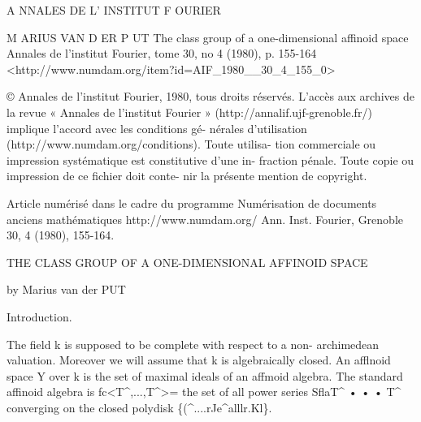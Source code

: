 \documentclass[
  10pt,
]{article}
\newenvironment{Shaded}{}{}
\newcommand{\NormalTok}[1]{#1}
\begin{document}
\begin{Shaded}
\begin{Highlighting}[]
\NormalTok{A NNALES DE L’ INSTITUT F OURIER}




\NormalTok{ M ARIUS VAN D ER P UT}
\NormalTok{ The class group of a one{-}dimensional affinoid space}
\NormalTok{ Annales de l’institut Fourier, tome 30, no 4 (1980), p. 155{-}164}
\NormalTok{ \textless{}http://www.numdam.org/item?id=AIF\_1980\_\_30\_4\_155\_0\textgreater{}}




\NormalTok{    © Annales de l’institut Fourier, 1980, tous droits réservés.}
\NormalTok{    L’accès aux archives de la revue « Annales de l’institut Fourier »}
\NormalTok{    (http://annalif.ujf{-}grenoble.fr/) implique l’accord avec les conditions gé{-}}
\NormalTok{    nérales d’utilisation (http://www.numdam.org/conditions). Toute utilisa{-}}
\NormalTok{    tion commerciale ou impression systématique est constitutive d’une in{-}}
\NormalTok{    fraction pénale. Toute copie ou impression de ce fichier doit conte{-}}
\NormalTok{    nir la présente mention de copyright.}




\NormalTok{                  Article numérisé dans le cadre du programme}
\NormalTok{                Numérisation de documents anciens mathématiques}
\NormalTok{                              http://www.numdam.org/}
\NormalTok{Ann. Inst. Fourier, Grenoble}
\NormalTok{30, 4 (1980), 155{-}164.}




\NormalTok{                THE CLASS GROUP}
\NormalTok{      OF A ONE{-}DIMENSIONAL AFFINOID SPACE}

\NormalTok{                           by Marius van der PUT}


\NormalTok{                                Introduction.}

\NormalTok{    The field k is supposed to be complete with respect to a non{-}}
\NormalTok{archimedean valuation. Moreover we will assume that k is algebraically}
\NormalTok{closed. An afflnoid space Y over k is the set of maximal ideals of an}
\NormalTok{affmoid algebra. The standard affinoid algebra is fc\textless{}T\^{},...,T\^{}\textgreater{}= the}
\NormalTok{set of all power series SflaT\^{} • • • T\^{} converging on the closed polydisk}
\NormalTok{                          \{(\^{}....rJe\^{}alllr.Kl\}.}


\end{Highlighting}
\end{Shaded}
\end{document}

